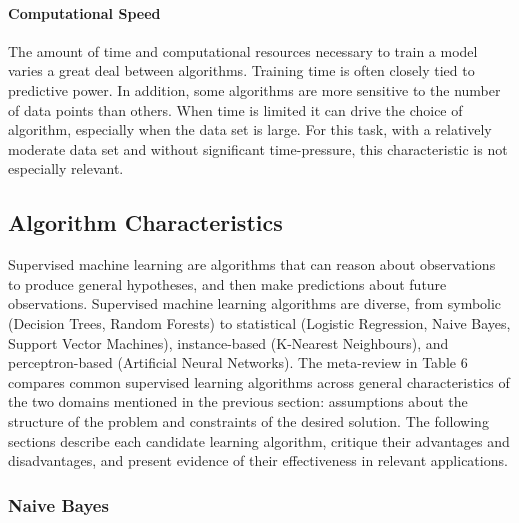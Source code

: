 \documentclass[../thesis/thesis.tex]{subfiles}
\begin{document}
\paragraph{Computational Speed}
The amount of time and computational resources necessary to train a model varies a great deal between algorithms. Training time is often closely tied to predictive power. In addition, some algorithms are more sensitive to the number of data points than others. When time is limited it can drive the choice of algorithm, especially when the data set is large. For this task, with a relatively moderate data set and without significant time-pressure, this characteristic is not especially relevant.

\subsection{Algorithm Characteristics}

Supervised machine learning are algorithms that can reason about observations to produce general hypotheses, and then make predictions about future observations. Supervised machine learning algorithms are diverse, from symbolic (Decision Trees, Random Forests) to statistical (Logistic Regression, Naive Bayes, Support Vector Machines), instance-based (K-Nearest Neighbours), and perceptron-based (Artificial Neural Networks). The meta-review in Table 6 compares common supervised learning algorithms across general characteristics of the two domains mentioned in the previous section: assumptions about the structure of the problem and constraints of the desired solution. The following sections describe each candidate learning algorithm, critique their advantages and disadvantages, and present evidence of their effectiveness in relevant applications.


\label{fig:litreview:algorithms:review}

\subsubsection{Naive Bayes}
\end{document}
